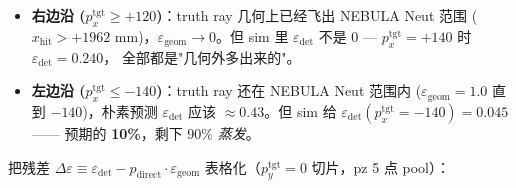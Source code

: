 \documentclass[a4paper,11pt]{ctexart}
\begin{document}
\begin{itemize}
    \item \textbf{右边沿 ($p_x^\mathrm{tgt} \ge +120$)}：truth ray 几何上已经飞出 NEBULA Neut 范围
          ($x_\mathrm{hit} > +1962$ mm)，$\varepsilon_\mathrm{geom} \to 0$。但 sim 里
          $\varepsilon_\mathrm{det}$ 不是 0 — $p_x^\mathrm{tgt}=+140$ 时 $\varepsilon_\mathrm{det} = 0.240$，
          全部都是"几何外多出来的"。
    \item \textbf{左边沿 ($p_x^\mathrm{tgt} \le -140$)}：truth ray 还在 NEBULA Neut 范围内
          ($\varepsilon_\mathrm{geom} = 1.0$ 直到 $-140$)，朴素预测 $\varepsilon_\mathrm{det}$
          应该 $\approx 0.43$。但 sim 给 $\varepsilon_\mathrm{det}(p_x^\mathrm{tgt}=-140) = 0.045$ ——
          预期的 \textbf{10\%}，剩下 90\% \emph{蒸发}。
\end{itemize}

把残差 $\Delta\varepsilon \equiv \varepsilon_\mathrm{det} - p_\mathrm{direct} \cdot \varepsilon_\mathrm{geom}$
表格化（$p_y^\mathrm{tgt}=0$ 切片，pz 5 点 pool）：
\end{document}

